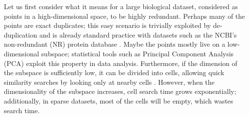 \documentclass[11pt]{elsarticle}
\renewcommand{\cite}{\citep} %
\theoremstyle{definition}
\theoremstyle{remark}
\numberwithin{equation}{section}
\begin{document}
Let us first consider what it means for a large biological dataset, considered as points in a high-dimensional space, to be highly redundant.
Perhaps many of the points are exact duplicates; this easy scenario is trivially exploited by de-duplication and is already standard practice with datasets such as
the NCBI's non-redundant (NR) protein database \cite{pruitt2005ncbi}.
Maybe the points mostly live on a low-dimensional subspace; statistical tools such as Principal Component Analysis (PCA) exploit this property in data analysis.
Furthermore, if the dimension of the subspace is sufficiently low,
it can be divided into cells, allowing quick similarity searches by looking only at nearby cells \cite{weber1998quantitative}.
However, when the dimensionality of the subspace increases, cell search time 
grows exponentially; additionally, in sparse datasets, most of the cells will 
be empty, which wastes search time.
\end{document}
